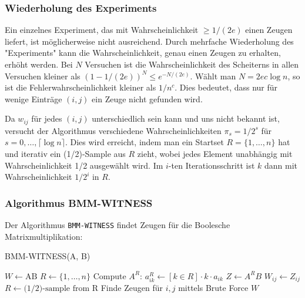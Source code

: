 \documentclass{scrartcl}
\numberwithin{equation}{section}
\begin{document}
\subsubsection{Wiederholung des Experiments}
Ein einzelnes Experiment, das mit Wahrscheinlichkeit $\ge 1/(2e)$ einen Zeugen liefert, ist möglicherweise nicht ausreichend. Durch mehrfache Wiederholung des "Experiments" kann die Wahrscheinlichkeit, genau einen Zeugen zu erhalten, erhöht werden. Bei $N$ Versuchen ist die Wahrscheinlichkeit des Scheiterns in allen Versuchen kleiner als $(1-1/(2e))^N \le e^{-N/(2e)}$. Wählt man $N = 2ec \log n$, so ist die Fehlerwahrscheinlichkeit kleiner als $1/n^c$. Dies bedeutet, dass nur für wenige Einträge $(i, j)$ ein Zeuge nicht gefunden wird.

Da $w_{ij}$ für jedes $(i, j)$ unterschiedlich sein kann und uns nicht bekannt ist, versucht der Algorithmus verschiedene Wahrscheinlichkeiten $\pi_s = 1/2^s$ für $s = 0, \ldots, \lceil \log n \rceil$. Dies wird erreicht, indem man ein Startset $R = \{1, \ldots, n\}$ hat und iterativ ein (1/2)-Sample aus $R$ zieht, wobei jedes Element unabhängig mit Wahrscheinlichkeit 1/2 ausgewählt wird. Im $i$-ten Iterationsschritt ist $k$ dann mit Wahrscheinlichkeit $1/2^i$ in $R$.

\subsubsection{Algorithmus BMM-WITNESS}
Der Algorithmus \texttt{BMM-WITNESS} findet Zeugen für die Boolesche Matrixmultiplikation:

\begin{algorithm}
	\caption{BMM-WITNESS(A, B)}
	\begin{algorithmic}[1]
		\State $W \gets \text{AB}$ 
		\State $R \gets \{1, \ldots, n\}$
		\State Compute $A^R$: $a_{ik}^R \gets [k \in R] \cdot k \cdot a_{ik}$ 
		\State $Z \gets A^R B$
		 
		\State $W_{ij} \gets Z_{ij}$
		\EndIf
		\EndFor
		\State $R \gets \text{(1/2)-sample from R}$ 
		\EndFor
		\EndFor
		\State Finde Zeugen für $i, j$ mittels Brute Force 
		\EndIf
		\EndFor
		\Return $W$
	\end{algorithmic}
\end{algorithm}
\end{document}
